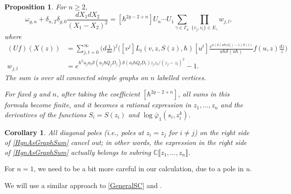 \documentclass[10pt,a4paper,oneside,no-math,reqno]{amsart}%
\theoremstyle{plain}
\newtheorem{proposition}[theorem]{Proposition}
\newtheorem{corollary}[theorem]{Corollary}
\theoremstyle{definition}
\theoremstyle{remark}
\numberwithin{equation}{section}
\renewcommand{\phi}{\varphi}
\newcommand{\mb}[1]{\mathbb{#1}}
\newcommand{\mc}[1]{\mathcal{#1}}
\newcommand{\1}{\mathds{1}}
\newcommand{\C}{\mb{C}}
\newcommand{\<}{\langle}
\renewcommand{\>}{\rangle}
\newcommand{\del}{\partial}
\begin{document}

\begin{proposition}
	For $ n \geq 2$,
	\begin{equation}\label{HgnAsGraphSum}
		\omega_{g,n} + \delta_{n,2} \delta_{g,0} \frac{dX_1 dX_2}{(X_1 - X_2)^2}
		=
		[\hbar^{2g-2+n}] U_n \dotsb U_1 \sum_{\gamma \in \Gamma_n} \prod_{\{ v_j, v_l\} \in E_\gamma} w_{j,l} ,
	\end{equation}
	where
	\begin{align}
		(Uf) (X(z))
		&=
		\sum_{j,t = 0}^\infty \big( d \frac{1}{dx}\big)^j \Big( [v^j] L_t(v, z, S(z),\hbar) [u^t]\frac{e^{u (\mc{S}(u \hbar z \del_z) -1) S(z)}}{u \hbar \mc{S}(u\hbar)} f(u,z) \frac{dz}{z} \Big)
		\\
		w_{j,l} 
		&=
		e^{\hbar^2 u_j u_l \mc{S}(u_j \hbar Q_j D_j) \mc{S}(u_l \hbar Q_l D_l) z_j z_l/ (z_j - z_l)^2} -1 .
	\end{align}
	The sum is over all connected simple graphs on $n$ labelled vertices.\par
	For fixed $g$ and $n$, after taking the coefficient $[\hbar^{2g-2+n}]$, all sums in this formula become finite, and it becomes a rational expression in $z_1, \dotsc, z_n$ and the derivatives of the functions $S_i = S(z_i)$ and $ \log \bar{\phi}_1 (s_i, z_i^k)$.
\end{proposition}

\begin{corollary}
	All diagonal poles (i.e., poles at $z_i = z_j$ for $i \neq j$) on the right side of \cref{HgnAsGraphSum} cancel out; in other words, the expression in the right side of \cref{HgnAsGraphSum} actually belongs to subring $ \C \llbracket z_1, \dotsc, z_n \rrbracket$.
\end{corollary}


For $ n=1$, we need to be a bit more careful in our calculation, due to a pole in $u$.

We will use a similar approach to \cref{GeneralSC} and \cite[Section 6.2]{BDKS22}.
\end{document}

